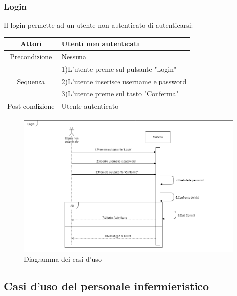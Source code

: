 \documentclass[a4paper]{report}
\begin{document}
            \subsubsection{Login}
                Il login permette ad un utente non autenticato di autenticarsi:
                \begin{table}[htbp]
                    \begin{tabular}{|c|l|}
                        \hline
                        Attori & Utenti non autenticati \\\hline
                    Precondizione & Nessuna \\\hline
                     & 1)L'utente preme sul pulsante "Login" \\
                    Sequenza & 2)L'utente inserisce username e password \\
                      & 3)L'utente preme sul tasto "Conferma" \\\hline
                    Post-condizione & Utente autenticato \\\hline
                    \end{tabular}
                \end{table}
                \begin{figure}[htbp]
                \centering
                \includegraphics[scale=0.4]{LoginDia.png}
                \caption{Diagramma dei casi d'uso}
            \end{figure}
            
        \newpage
        \subsection{Casi d'uso del personale infermieristico}
\end{document}

